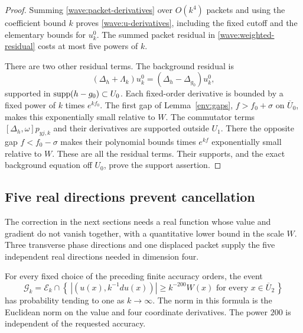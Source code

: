 \begin{proof}
Summing \eqref{wave:packet-derivatives} over $O(k^4)$ packets and using
the coefficient bound $k$ proves \eqref{wave:u-derivatives}, including
the fixed cutoff and the elementary bounds for $u_k^0$. The summed
packet residual in \eqref{wave:weighted-residual} costs at most five
powers of $k$.

There are two other residual terms. The background residual is
\[
 (\Delta_h+\Lambda_k)u_k^0=(\Delta_h-\Delta_{g_0})u_k^0,
\]
supported in $\operatorname{supp}(h-g_0)\subset U_0$. Each fixed-order derivative
is bounded by a fixed power of $k$ times $e^{kf_0}$. The first gap of
Lemma~\ref{env:gaps}, $f>f_0+\sigma$ on $\overline U_0$, makes this
exponentially small relative to $W$. The commutator terms
$[\Delta_h,\omega]p_{yj,k}$ and their derivatives are supported
outside $U_1$. There the opposite gap $f<f_0-\sigma$ makes their
polynomial bounds times $e^{kf}$ exponentially small relative to $W$.
These are all the residual terms. Their supports, and the exact
background equation off $U_0$, prove the support assertion.
\end{proof}

\subsection{Five real directions prevent cancellation}

The correction in the next sections needs a real function whose value
and gradient do not vanish together, with a quantitative lower bound
in the scale $W$. Three transverse phase directions and one displaced
packet supply the five independent real directions needed in dimension
four.

\begin{lemma}\label{wave:noncancellation}
For every fixed choice of the preceding finite accuracy orders, the event
\begin{equation}
 \mathcal G_k=\mathcal E_k\cap
 \left\{\, |(u(x),k^{-1}du(x))|
                 \ge k^{-200}W(x)
                     \text{ for every }x\in\overline U_2\,\right\}
 \label{wave:good-event}
\end{equation}
has probability tending to one as $k\to\infty$. The norm in this
formula is the Euclidean norm on the value and four coordinate
derivatives. The power $200$ is independent of the requested accuracy.
\end{lemma}

